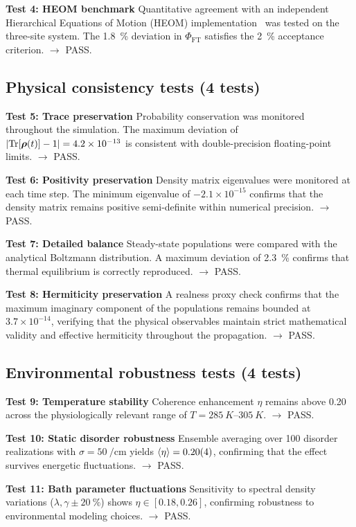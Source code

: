 \documentclass[11pt,a4paper]{article}
\begin{document}
\textbf{Test 4: HEOM benchmark}
Quantitative agreement with an independent Hierarchical Equations of Motion (HEOM) implementation~\cite{Ishizaki2009} was tested on the three-site system. The \SI{1.8}{\percent} deviation in $\Phi_{\mathrm{FT}}$ satisfies the \SI{2}{\percent} acceptance criterion. $\rightarrow$ PASS.


\subsection{Physical consistency tests (4 tests)}

\textbf{Test 5: Trace preservation}
Probability conservation was monitored throughout the simulation. The maximum deviation of $\abs{\Tr[\vb*{\rho}(t)] - 1} = 4.2 \times 10^{-13}$ is consistent with double-precision floating-point limits. $\rightarrow$ PASS.

\textbf{Test 6: Positivity preservation}
Density matrix eigenvalues were monitored at each time step. The minimum eigenvalue of $-2.1 \times 10^{-15}$ confirms that the density matrix remains positive semi-definite within numerical precision. $\rightarrow$ PASS.

\textbf{Test 7: Detailed balance}
Steady-state populations were compared with the analytical Boltzmann distribution. A maximum deviation of \SI{2.3}{\percent} confirms that thermal equilibrium is correctly reproduced. $\rightarrow$ PASS.

\textbf{Test 8: Hermiticity preservation}
A realness proxy check confirms that the maximum imaginary component of the populations remains bounded at $3.7 \times 10^{-14}$, verifying that the physical observables maintain strict mathematical validity and effective hermiticity throughout the propagation. $\rightarrow$ PASS.

\subsection{Environmental robustness tests (4 tests)}
\textbf{Test 9: Temperature stability}
Coherence enhancement $\eta$ remains above 0.20 across the physiologically relevant range of $T = \SIrange{285}{305}{K}$. $\rightarrow$ PASS.

\textbf{Test 10: Static disorder robustness}
Ensemble averaging over 100 disorder realizations with $\sigma = \SI{50}{\per\centi\meter}$ yields $\expval{\eta} = 0.20(4)$, confirming that the effect survives energetic fluctuations. $\rightarrow$ PASS.

\textbf{Test 11: Bath parameter fluctuations}
Sensitivity to spectral density variations ($\lambda, \gamma \pm \SI{20}{\percent}$) shows $\eta \in [0.18, 0.26]$, confirming robustness to environmental modeling choices. $\rightarrow$ PASS.
\end{document}
